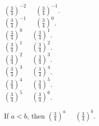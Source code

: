 \documentclass{ximera}
\author{Lee Wayand}
\begin{document}
\begin{example}


\begin{question}


$\left( \frac{3}{4} \right)^{-2}$ \, \wordChoice{\choice{<} \choice[correct]{>}} \, $\left( \frac{3}{4} \right)^{-1}$.  \\

$\left( \frac{3}{4} \right)^{-1}$ \, \wordChoice{\choice{<} \choice[correct]{>}} \, $\left( \frac{3}{4} \right)^{0}$.  \\

$\left( \frac{3}{4} \right)^{0}$ \, \wordChoice{\choice{<} \choice[correct]{>}} \, $\left( \frac{3}{4} \right)^{1}$.  \\

$\left( \frac{3}{4} \right)^{1}$ \, \wordChoice{\choice{<} \choice[correct]{>}} \, $\left( \frac{3}{4} \right)^{2}$.  \\

$\left( \frac{3}{4} \right)^{2}$ \, \wordChoice{\choice{<} \choice[correct]{>}} \, $\left( \frac{3}{4} \right)^{3}$.  \\

$\left( \frac{3}{4} \right)^{3}$ \, \wordChoice{\choice{<} \choice[correct]{>}} \, $\left( \frac{3}{4} \right)^{4}$.  \\

$\left( \frac{3}{4} \right)^{4}$ \, \wordChoice{\choice{<} \choice[correct]{>}} \, $\left( \frac{3}{4} \right)^{5}$.  \\

$\left( \frac{3}{4} \right)^{5}$ \, \wordChoice{\choice{<} \choice[correct]{>}} \, $\left( \frac{3}{4} \right)^{6}$.  \\


\end{question}




\begin{question}



If $a < b$, then $\left( \frac{3}{4} \right)^{a}$ \, \wordChoice{\choice{<} \choice[correct]{>}} \, $\left( \frac{3}{4} \right)^{b}$.  \\



\end{question}





\begin{question}




\end{question}
\end{example}
\end{document}
